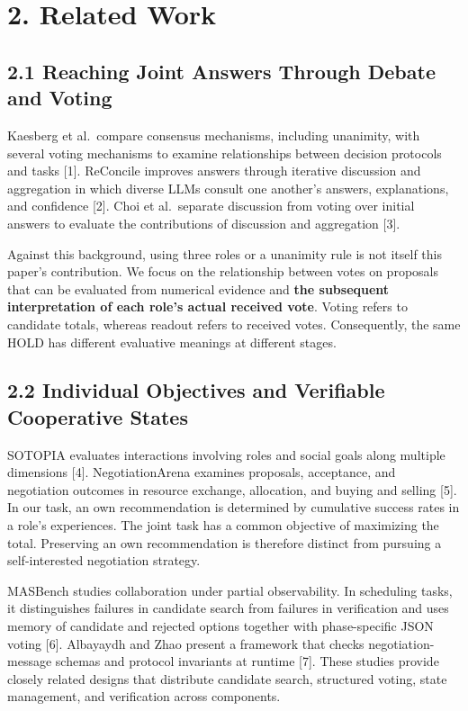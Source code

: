 \documentclass[10pt,a4paper]{article}
\begin{document}
\section{2. Related Work}\label{paper-04-related-work}

\subsection{2.1 Reaching Joint Answers Through Debate and Voting}\label{paper-04-reaching-joint-answers-through-debate-and-voting}

Kaesberg et al.~compare consensus mechanisms, including unanimity, with several voting mechanisms to examine relationships between decision protocols and tasks {[}1{]}. ReConcile improves answers through iterative discussion and aggregation in which diverse LLMs consult one another's answers, explanations, and confidence {[}2{]}. Choi et al.~separate discussion from voting over initial answers to evaluate the contributions of discussion and aggregation {[}3{]}.

Against this background, using three roles or a unanimity rule is not itself this paper's contribution. We focus on the relationship between votes on proposals that can be evaluated from numerical evidence and \textbf{the subsequent interpretation of each role's actual received vote}. Voting refers to candidate totals, whereas readout refers to received votes. Consequently, the same HOLD has different evaluative meanings at different stages.

\subsection{2.2 Individual Objectives and Verifiable Cooperative States}\label{paper-04-individual-objectives-and-verifiable-cooperative-states}

SOTOPIA evaluates interactions involving roles and social goals along multiple dimensions {[}4{]}. NegotiationArena examines proposals, acceptance, and negotiation outcomes in resource exchange, allocation, and buying and selling {[}5{]}. In our task, an own recommendation is determined by cumulative success rates in a role's experiences. The joint task has a common objective of maximizing the total. Preserving an own recommendation is therefore distinct from pursuing a self-interested negotiation strategy.

MASBench studies collaboration under partial observability. In scheduling tasks, it distinguishes failures in candidate search from failures in verification and uses memory of candidate and rejected options together with phase-specific JSON voting {[}6{]}. Albayaydh and Zhao present a framework that checks negotiation-message schemas and protocol invariants at runtime {[}7{]}. These studies provide closely related designs that distribute candidate search, structured voting, state management, and verification across components.
\end{document}

